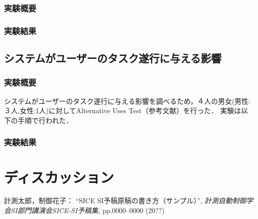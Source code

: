\documentclass[a4paper]{jarticle}
\begin{document}
\subsubsection{実験概要}
\subsubsection{実験結果}
\subsection{システムがユーザーのタスク遂行に与える影響}
\subsubsection{実験概要}
システムがユーザーのタスク遂行に与える影響を調べるため，４人の男女(男性:３人,女性:1人)に対してAlternative Uses Test（参考文献）を行った．
実験は以下の手順で行われた．
\begin{emanuate}
    \item 
\end{emanuate}

\subsubsection{実験結果}
\section{ディスカッション}
%
%
\begin{thebibliography}{99}
	計測太郎，制御花子：
	``SICE SI予稿原稿の書き方（サンプル）'',  
   {\it 計測自動制御学会SI部門講演会SICE-SI予稿集}, 
    pp.0000--0000 (20??)
\end{thebibliography}
%
%
%
\end{document}
